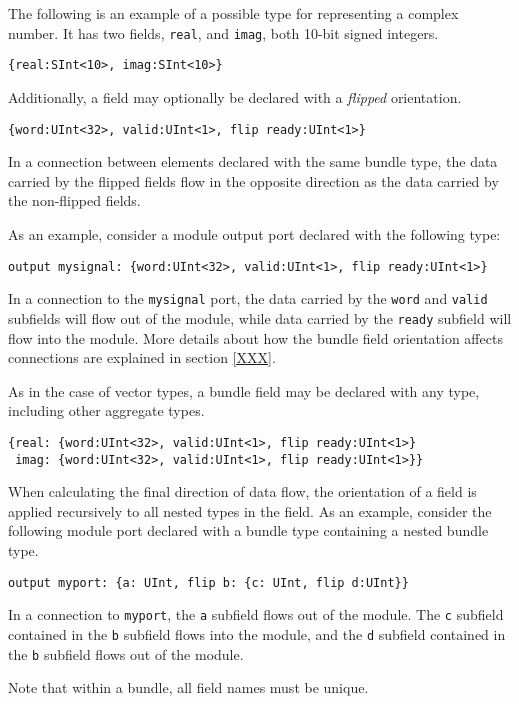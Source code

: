 \documentclass[12pt]{article}
\begin{document}
The following is an example of a possible type for representing a complex number. It has two fields, \verb|real|, and \verb|imag|, both 10-bit signed integers.
\begin{verbatim}
{real:SInt<10>, imag:SInt<10>}
\end{verbatim}

Additionally, a field may optionally be declared with a {\em flipped} orientation.
\begin{verbatim}
{word:UInt<32>, valid:UInt<1>, flip ready:UInt<1>}
\end{verbatim}
In a connection between elements declared with the same bundle type, the data carried by the flipped fields flow in the opposite direction as the data carried by the non-flipped fields.

As an example, consider a module output port declared with the following type:
\begin{verbatim}
output mysignal: {word:UInt<32>, valid:UInt<1>, flip ready:UInt<1>}
\end{verbatim}
In a connection to the \verb|mysignal| port, the data carried by the \verb|word| and \verb|valid| subfields will flow out of the module, while data carried by the \verb|ready| subfield will flow into the module. More details about how the bundle field orientation affects connections are explained in section \ref{XXX}.

As in the case of vector types, a bundle field may be declared with any type, including other aggregate types. 
\begin{verbatim}
{real: {word:UInt<32>, valid:UInt<1>, flip ready:UInt<1>}
 imag: {word:UInt<32>, valid:UInt<1>, flip ready:UInt<1>}}
\end{verbatim}

When calculating the final direction of data flow, the orientation of a field is applied recursively to all nested types in the field. As an example, consider the following module port declared with a bundle type containing a nested bundle type.
\begin{verbatim}
output myport: {a: UInt, flip b: {c: UInt, flip d:UInt}}
\end{verbatim}
In a connection to \verb|myport|, the \verb|a| subfield flows out of the module. The \verb|c| subfield contained in the \verb|b| subfield flows into the module, and the \verb|d| subfield contained in the \verb|b| subfield flows out of the module.

Note that within a bundle, all field names must be unique.
\end{document}
